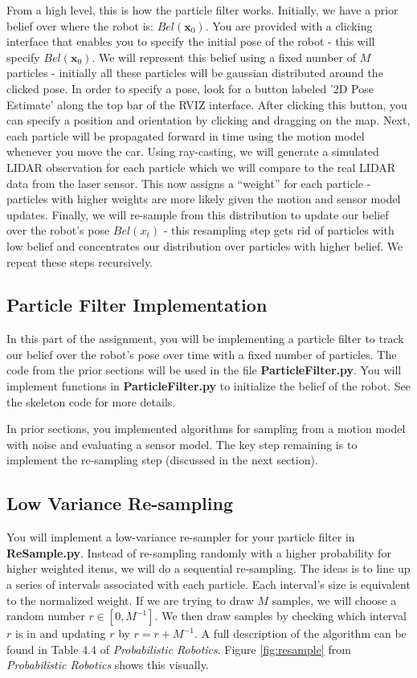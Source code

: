 \documentclass[final]{article}
\begin{document}
From a high level, this is how the particle filter works. Initially, we have a prior belief over where the robot is: $Bel(\mathbf{x}_0)$. You are provided with a clicking interface that enables you to specify the initial pose of the robot - this will specify $Bel(\mathbf{x}_0)$. We will represent this belief using a fixed number of $M$ particles - initially all these particles will be gaussian distributed around the clicked pose. In order to specify a pose, look for a button labeled '2D Pose Estimate' along the top bar of the RVIZ interface. After clicking this button, you  can specify a position and orientation by clicking and dragging on the map. Next, each particle will be propagated forward in time using the motion model whenever you move the car. Using ray-casting, we will generate a simulated LIDAR observation for each particle which we will compare to the real LIDAR data from the laser sensor. This now assigns a ``weight'' for each particle - particles with higher weights are more likely given the motion and sensor model updates. Finally, we will re-sample from this distribution to update our belief over the robot's pose $Bel(x_t)$ - this resampling step gets rid of particles with low belief and concentrates our distribution over particles with higher belief. We repeat these steps recursively.

\subsection{Particle Filter Implementation}
In this part of the assignment, you will be implementing a particle filter to track our belief over the robot's pose over time with a fixed number of particles. The code from the prior sections will be used in the file \textbf{ParticleFilter.py}. You will implement functions in \textbf{ParticleFilter.py} to initialize the belief of the robot. See the skeleton code for more details.

In prior sections, you implemented algorithms for sampling from a motion model with noise and evaluating a sensor model. The key step remaining is to implement the re-sampling step (discussed in the next section).

\subsection{Low Variance Re-sampling}
You will implement a low-variance re-sampler for your particle filter in \textbf{ReSample.py}. Instead of re-sampling randomly with a higher probability for higher weighted items, we will do a sequential re-sampling. The ideas is to line up a series of intervals associated with each particle. Each interval's size is equivalent to the normalized weight. If we are trying to draw \(M\) samples, we will choose a random number \(r\in [0,M^{-1}]\). We then draw samples by checking which interval \(r\) is in and updating \(r\) by \(r = r + M^{-1}\). A full description of the algorithm can be found in Table 4.4 of \textit{Probabilistic Robotics}. Figure \ref{fig:resample} from \textit{Probabilistic Robotics} shows this visually.
\end{document}
